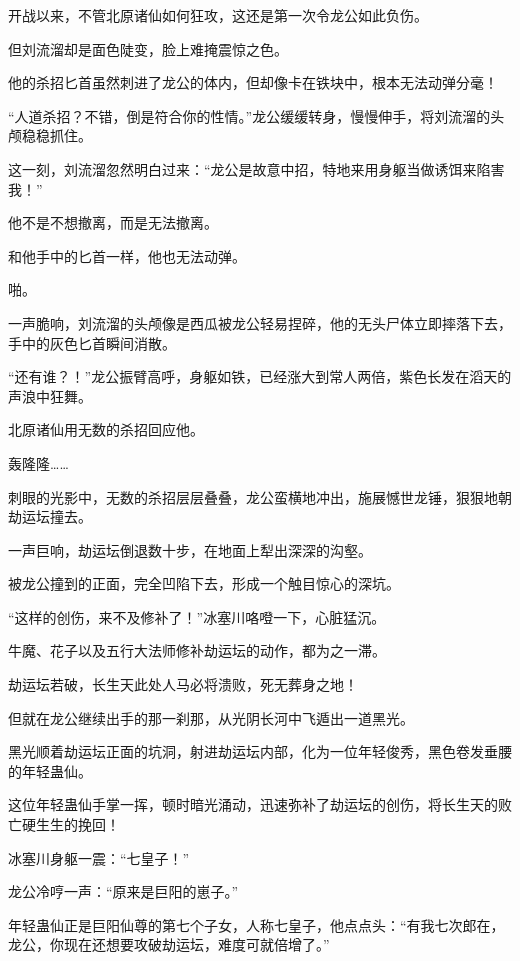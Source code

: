 \begin{this_body}
开战以来，不管北原诸仙如何狂攻，这还是第一次令龙公如此负伤。

但刘流溜却是面色陡变，脸上难掩震惊之色。

他的杀招匕首虽然刺进了龙公的体内，但却像卡在铁块中，根本无法动弹分毫！

“人道杀招？不错，倒是符合你的性情。”龙公缓缓转身，慢慢伸手，将刘流溜的头颅稳稳抓住。

这一刻，刘流溜忽然明白过来：“龙公是故意中招，特地来用身躯当做诱饵来陷害我！”

他不是不想撤离，而是无法撤离。

和他手中的匕首一样，他也无法动弹。

啪。

一声脆响，刘流溜的头颅像是西瓜被龙公轻易捏碎，他的无头尸体立即摔落下去，手中的灰色匕首瞬间消散。

“还有谁？！”龙公振臂高呼，身躯如铁，已经涨大到常人两倍，紫色长发在滔天的声浪中狂舞。

北原诸仙用无数的杀招回应他。

轰隆隆……

刺眼的光影中，无数的杀招层层叠叠，龙公蛮横地冲出，施展憾世龙锤，狠狠地朝劫运坛撞去。

一声巨响，劫运坛倒退数十步，在地面上犁出深深的沟壑。

被龙公撞到的正面，完全凹陷下去，形成一个触目惊心的深坑。

“这样的创伤，来不及修补了！”冰塞川咯噔一下，心脏猛沉。

牛魔、花子以及五行大法师修补劫运坛的动作，都为之一滞。

劫运坛若破，长生天此处人马必将溃败，死无葬身之地！

但就在龙公继续出手的那一刹那，从光阴长河中飞遁出一道黑光。

黑光顺着劫运坛正面的坑洞，射进劫运坛内部，化为一位年轻俊秀，黑色卷发垂腰的年轻蛊仙。

这位年轻蛊仙手掌一挥，顿时暗光涌动，迅速弥补了劫运坛的创伤，将长生天的败亡硬生生的挽回！

冰塞川身躯一震：“七皇子！”

龙公冷哼一声：“原来是巨阳的崽子。”

年轻蛊仙正是巨阳仙尊的第七个子女，人称七皇子，他点点头：“有我七次郎在，龙公，你现在还想要攻破劫运坛，难度可就倍增了。”

\end{this_body}

